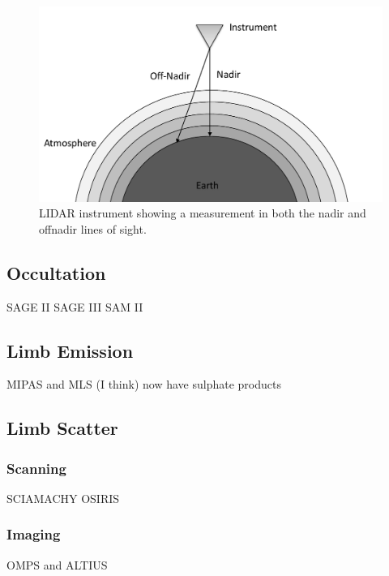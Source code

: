 \begin{figure}[h]
    \includegraphics[width=1.0\textwidth]{./Images/LidarGeometry.pdf}
    \caption[LIDAR Geometry]{LIDAR instrument showing a measurement in both the nadir and offnadir lines of sight.}
    \label{fig:LidarGeometry}
\end{figure}

\subsection{Occultation}

SAGE II SAGE III SAM II

\subsection{Limb Emission}

MIPAS and MLS (I think) now have sulphate products

\subsection{Limb Scatter}
\subsubsection{Scanning}

SCIAMACHY OSIRIS

\subsubsection{Imaging}

OMPS and ALTIUS 